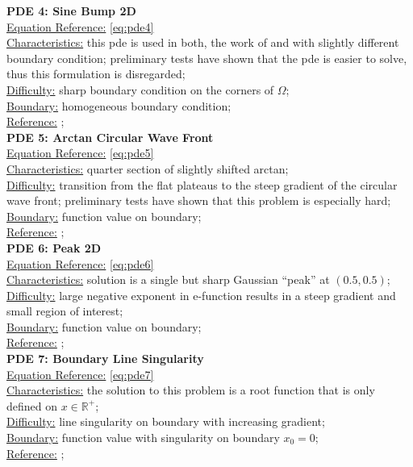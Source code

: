 \documentclass[./\jobname.tex]{subfiles}
\begin{document}
\textbf{PDE 4: Sine Bump 2D} \\
\underline{Equation Reference:} \eqref{eq:pde4} \\
\underline{Characteristics:} this \gls{pde} is used in both, the work of \cite{chaquet_using_2019} and  \cite{mitchell_nist_2018} with slightly different boundary condition; preliminary tests have shown that the \cite{chaquet_using_2019} \gls{pde} is easier to solve, thus this formulation is disregarded;\\
\underline{Difficulty:} sharp boundary condition on the corners of $\Omega$; \\
\underline{Boundary:} homogeneous boundary condition; \\
\underline{Reference:} \cite{mitchell_nist_2018};\\

\textbf{PDE 5: Arctan Circular Wave Front} \\
\underline{Equation Reference:} \eqref{eq:pde5} \\
\underline{Characteristics:} quarter section of slightly shifted arctan; \\
\underline{Difficulty:} transition from the flat plateaus to the steep gradient of the circular wave front; preliminary tests have shown that this problem is especially hard; \\
\underline{Boundary:} function value on boundary; \\
\underline{Reference:} \cite{mitchell_nist_2018}; \\

\textbf{PDE 6: Peak 2D} \\
\underline{Equation Reference:} \eqref{eq:pde6} \\
\underline{Characteristics:} solution is a single but sharp Gaussian ``peak'' at $(0.5, 0.5)$; \\
\underline{Difficulty:} large negative exponent in e-function results in a steep gradient and small region of interest; \\
\underline{Boundary:} function value on boundary; \\
\underline{Reference:} \cite{mitchell_nist_2018}; \\

\textbf{PDE 7: Boundary Line Singularity} \\
\underline{Equation Reference:} \eqref{eq:pde7} \\
\underline{Characteristics:} the solution to this problem is a root function that is only defined on $x \in \mathbb{R}^{+}$; \\
\underline{Difficulty:} line singularity on boundary with increasing gradient; \\
\underline{Boundary:} function value with singularity on boundary $x_0 = 0$; \\
\underline{Reference:} \cite{mitchell_nist_2018}; \\
\end{document}
